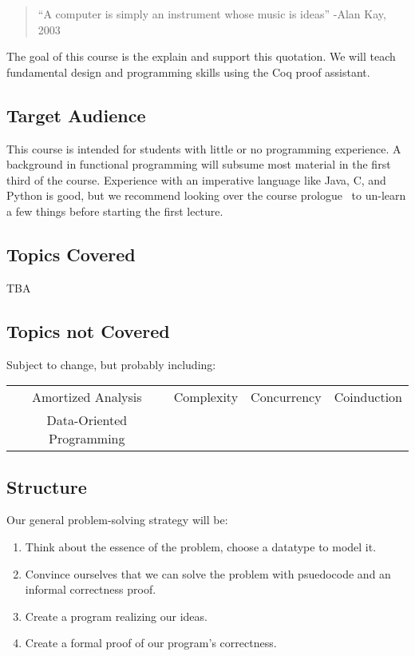 \documentclass{article}
\begin{document}
\maketitle

\begin{quote}
  ``A computer is simply an instrument whose music is ideas'' -Alan Kay, 2003%
\end{quote}

The goal of this course is the explain and support this quotation.
We will teach fundamental design and programming skills using the Coq proof assistant.

\subsection*{Target Audience}
This course is intended for students with little or no programming experience.
A background in functional programming will subsume most material in the first third of the course.
Experience with an imperative language like Java, C, and Python is good, but we recommend looking over the course prologue~\cite{TODO} to un-learn a few things before starting the first lecture.

\subsection*{Topics Covered}
TBA

\subsection*{Topics not Covered}
Subject to change, but probably including:

\begin{center}
  \begin{tabular}{c c c c}
    Amortized Analysis & Complexity & Concurrency & Coinduction
  \\Data-Oriented Programming & & &
  \end{tabular}
\end{center}

\subsection*{Structure}
Our general problem-solving strategy will be:
\begin{enumerate}
\item Think about the essence of the problem, choose a datatype to model it.
\item Convince ourselves that we can solve the problem with psuedocode and an informal correctness proof.
\item Create a program realizing our ideas.
\item Create a formal proof of our program's correctness.
\end{enumerate}
\end{document}
